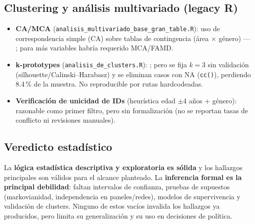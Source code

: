 \subsection{Clustering y análisis multivariado (legacy R)}

\begin{itemize}
  \item \textbf{CA/MCA} (\texttt{analisis\_multivariado\_base\_gran\_table.R}):
        uso de correspondencia simple (CA) sobre tablas de contingencia (área
        $\times$ género) — ; para más variables
        habría requerido MCA/FAMD.
  \item \textbf{k-prototypes} (\texttt{analisis\_de\_clusters.R}):
        ; pero se fija $k=3$ sin
        validación (silhouette/Calinski--Harabasz) y se eliminan casos con NA
        (\texttt{cc()}), perdiendo 8.4\,\% de la muestra. No reproducible por
        rutas hardcodeadas.
  \item \textbf{Verificación de unicidad de IDs} (heurística edad $\pm$4 años +
        género): razonable como primer filtro, pero sin formalización (no se
        reportan tasas de conflicto ni revisiones manuales).
\end{itemize}

\subsection{Veredicto estadístico}

\begin{tcolorbox}[hallazgo]
La \textbf{lógica estadística descriptiva y exploratoria es sólida} y los
hallazgos principales son válidos para el alcance planteado. La \textbf{inferencia
formal es la principal debilidad}: faltan intervalos de confianza, pruebas de
supuestos (markovianidad, independencia en paneles/redes), modelos de supervivencia
y validación de clusters. Ninguno de estos vacíos invalida los hallazgos ya
producidos, pero limita su generalización y su uso en decisiones de política.
\end{tcolorbox}
